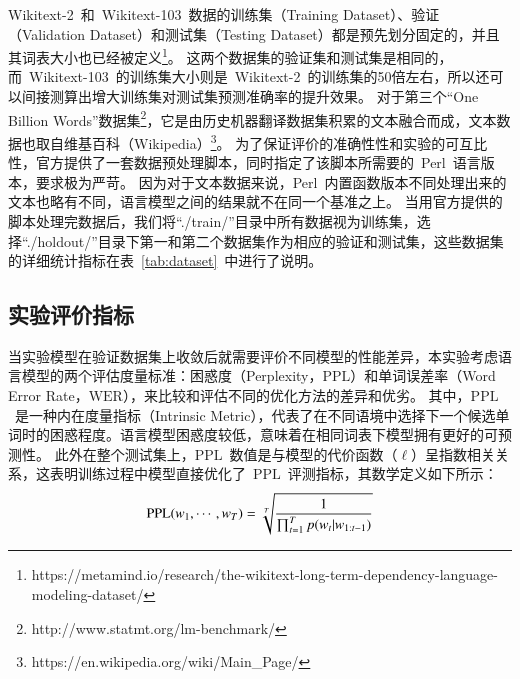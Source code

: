 Wikitext-2~和~Wikitext-103~数据的训练集（Training Dataset）、验证（Validation Dataset）和测试集（Testing Dataset）都是预先划分固定的，并且其词表大小也已经被定义\footnote{https://metamind.io/research/the-wikitext-long-term-dependency-language-modeling-dataset/}。
这两个数据集的验证集和测试集是相同的，而~Wikitext-103~的训练集大小则是~Wikitext-2~的训练集的50倍左右，所以还可以间接测算出增大训练集对测试集预测准确率的提升效果。
对于第三个``One Billion Words''数据集\footnote{http://www.statmt.org/lm-benchmark/}，它是由历史机器翻译数据集积累的文本融合而成，文本数据也取自维基百科（Wikipedia）\footnote{https://en.wikipedia.org/wiki/Main\_Page/}。
为了保证评价的准确性性和实验的可互比性，官方提供了一套数据预处理脚本，同时指定了该脚本所需要的~Perl~语言版本，要求极为严苛。
因为对于文本数据来说，Perl~内置函数版本不同处理出来的文本也略有不同，语言模型之间的结果就不在同一个基准之上。
当用官方提供的脚本处理完数据后，我们将``./train/''目录中所有数据视为训练集，选择``./holdout/''目录下第一和第二个数据集作为相应的验证和测试集，这些数据集的详细统计指标在表~\ref{tab:dataset}~中进行了说明。

\subsection{实验评价指标}
当实验模型在验证数据集上收敛后就需要评价不同模型的性能差异，本实验考虑语言模型的两个评估度量标准：困惑度（Perplexity，$ \mathrm{PPL} $）和单词误差率（Word Error Rate，$\mathrm{WER} $），来比较和评估不同的优化方法的差异和优劣。
其中，$\mathrm{PPL}$~是一种内在度量指标（Intrinsic Metric），代表了在不同语境中选择下一个候选单词时的困惑程度。语言模型困惑度较低，意味着在相同词表下模型拥有更好的可预测性。
此外在整个测试集上，$\mathrm{PPL}$~数值是与模型的代价函数（$\ell$）呈指数相关关系，这表明训练过程中模型直接优化了~$ \mathrm{PPL} $~评测指标，其数学定义如下所示：
\begin{equation}\label{equ:ppl}
\setlength{\abovedisplayskip}{10pt}
\setlength{\belowdisplayskip}{10pt}
   \mathrm{PPL}(w_1,\cdots,w_T)=\sqrt[T]{\frac{1}{\prod_{t=1}^T p(w_t|w_{1:t-1})}}
\end{equation}

